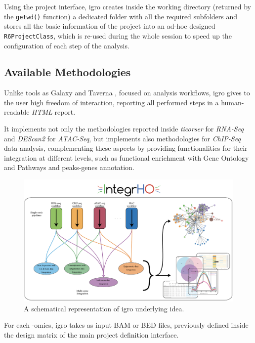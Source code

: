 Using the project interface, \gls{igro} creates inside the working directory (returned by the \lstinline!getwd()! function) a dedicated folder with all the required subfolders and stores all the basic information of the project into an ad-hoc designed \lstinline!R6ProjectClass!, which is re-used during the whole session to speed up the configuration of each step of the analysis.


\subsection{Available Methodologies}

Unlike tools as Galaxy \cite{Hillman-Jackson2012} and Taverna \cite{Wolstencroft2013}, focused on analysis workflows, \gls{igro} gives to the user high freedom of interaction, reporting all performed steps in a human-readable \textit{HTML} report.
 
It implements not only the methodologies reported inside \textit{ticorser} for \textit{RNA-Seq} and \textit{DEScan2} for \textit{ATAC-Seq}, but implements also methodologies for \textit{ChIP-Seq} data analysis, complementing these aspects by providing functionalities for their integration at different levels, such as functional enrichment with Gene Ontology and Pathways and peaks-genes annotation.

\begin{figure}[H]
\centering
\includegraphics[width=\textwidth, keepaspectratio]{img/integrho/integrho_scheme.pdf}
\caption[integrho representation]{A schematical representation of \gls{igro} underlying idea.}
\label{fig:integrhoidea}
\end{figure}

For each -omics, \gls{igro} takes as input BAM or BED files, previously defined inside the design matrix of the main project definition interface.

